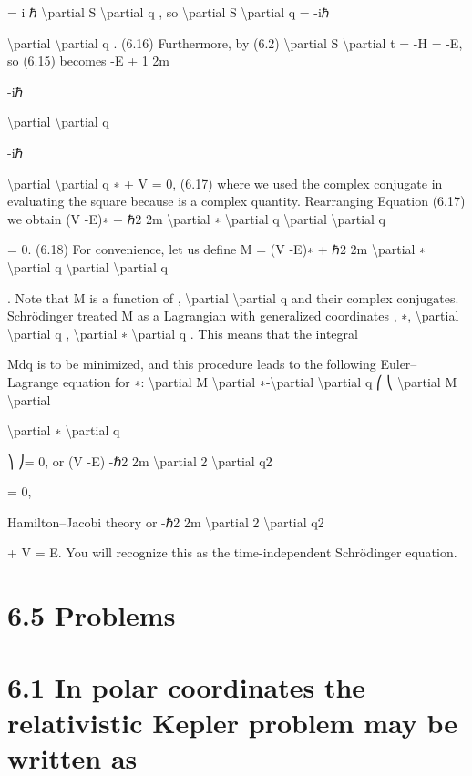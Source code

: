 \begin{exercise}
=  i
ℏ
\textbackslash{}partial S
\textbackslash{}partial q ,
so
\textbackslash{}partial S
\textbackslash{}partial q = -iℏ

\textbackslash{}partial
\textbackslash{}partial q .
(6.16)
Furthermore, by (6.2)
\textbackslash{}partial S
\textbackslash{}partial t = -H = -E,
so (6.15) becomes
-E + 1
2m

-iℏ

\textbackslash{}partial
\textbackslash{}partial q

-iℏ

\textbackslash{}partial
\textbackslash{}partial q
∗
+ V = 0,
(6.17)
where we used the complex conjugate in evaluating the square because  is a
complex quantity.
Rearranging Equation (6.17) we obtain
(V -E)∗ + ℏ2
2m
\textbackslash{}partial ∗
\textbackslash{}partial q
\textbackslash{}partial
\textbackslash{}partial q

= 0.
(6.18)
For convenience, let us define
M = (V -E)∗ + ℏ2
2m
\textbackslash{}partial ∗
\textbackslash{}partial q
\textbackslash{}partial
\textbackslash{}partial q

.
Note that M is a function of , \textbackslash{}partial
\textbackslash{}partial q and their complex conjugates. Schrödinger
treated M as a Lagrangian with generalized coordinates , ∗, \textbackslash{}partial
\textbackslash{}partial q , \textbackslash{}partial ∗
\textbackslash{}partial q . This
means that the integral

Mdq is to be minimized, and this procedure leads to
the following Euler--Lagrange equation for ∗:
\textbackslash{}partial M
\textbackslash{}partial ∗-\textbackslash{}partial
\textbackslash{}partial q
⎛
⎝
\textbackslash{}partial M
\textbackslash{}partial

\textbackslash{}partial ∗
\textbackslash{}partial q

⎞
⎠= 0,
or
(V -E) -ℏ2
2m
\textbackslash{}partial 2
\textbackslash{}partial q2

= 0,

Hamilton--Jacobi theory
or
-ℏ2
2m
\textbackslash{}partial 2
\textbackslash{}partial q2

+ V  = E.
You will recognize this as the time-independent Schrödinger equation.
\end{exercise}

\section*{6.5  Problems}

\section*{6.1  In polar coordinates the relativistic Kepler problem may be written as}

